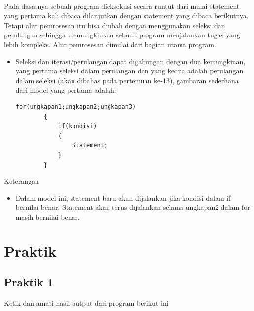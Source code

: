 \documentclass[a4paper,12pt]{article}
\begin{document}
\paragraph{}
Pada dasarnya sebuah program dieksekusi secara runtut dari mulai statement yang
pertama kali dibaca dilanjutkan dengan statement yang dibaca berikutnya.
Tetapi alur pemrosesan itu bisa diubah dengan menggunakan seleksi dan
perulangan sehingga memungkinkan sebuah program menjalankan tugas yang lebih
kompleks.
Alur pemrosesan dimulai dari bagian utama program.
\begin{itemize}[label=*.] 
    \item Seleksi dan iterasi/perulangan dapat digabungan dengan dua kemungkinan,
    yang pertama seleksi dalam perulangan dan yang kedua adalah perulangan
    dalam seleksi (akan dibahas pada pertemuan ke-13), gambaran sederhana dari
    model yang pertama adalah:
    \begin{lstlisting}[frame=single]
        for(ungkapan1;ungkapan2;ungkapan3)
        {
            if(kondisi)
            {
                Statement;
            }
        }
    \end{lstlisting}
\end{itemize}
Keterangan
\begin{itemize}[label=*.]
    \item Dalam model ini, statement baru akan dijalankan jika kondisi dalam if bernilai
benar. Statement akan terus dijalankan selama ungkapan2 dalam for masih
bernilai benar.
\end{itemize}
\newpage
\section{Praktik}
\subsection{Praktik 1}
Ketik dan amati hasil output dari program berikut ini\\
\end{document}
